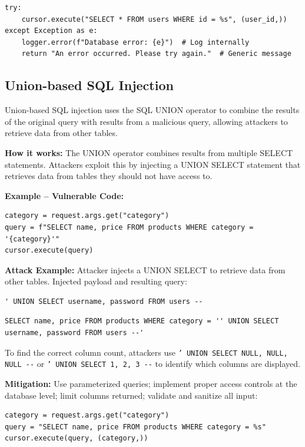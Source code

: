 \begin{lstlisting}[style=pycode]
try:
    cursor.execute("SELECT * FROM users WHERE id = %s", (user_id,))
except Exception as e:
    logger.error(f"Database error: {e}")  # Log internally
    return "An error occurred. Please try again."  # Generic message
\end{lstlisting}

\subsection{Union-based SQL Injection}
\label{sec:sqli_union}

Union-based SQL injection uses the SQL UNION operator to combine the results of the original query with results from a malicious query, allowing attackers to retrieve data from other tables.

\textbf{How it works:} The UNION operator combines results from multiple SELECT statements. Attackers exploit this by injecting a UNION SELECT statement that retrieves data from tables they should not have access to.

\textbf{Example -- Vulnerable Code:}

\begin{lstlisting}[style=pycode]
category = request.args.get("category")
query = f"SELECT name, price FROM products WHERE category = '{category}'"
cursor.execute(query)
\end{lstlisting}

\textbf{Attack Example:} Attacker injects a UNION SELECT to retrieve data from other tables. Injected payload and resulting query:
\begin{lstlisting}[style=attackcode]
' UNION SELECT username, password FROM users --
\end{lstlisting}
\begin{lstlisting}[style=attackcode]
SELECT name, price FROM products WHERE category = '' UNION SELECT username, password FROM users --'
\end{lstlisting}
To find the correct column count, attackers use \texttt{' UNION SELECT NULL, NULL, NULL -{}-} or \texttt{' UNION SELECT 1, 2, 3 -{}-} to identify which columns are displayed.

\textbf{Mitigation:} Use parameterized queries; implement proper access controls at the database level; limit columns returned; validate and sanitize all input:

\begin{lstlisting}[style=pycode]
category = request.args.get("category")
query = "SELECT name, price FROM products WHERE category = %s"
cursor.execute(query, (category,))
\end{lstlisting}

